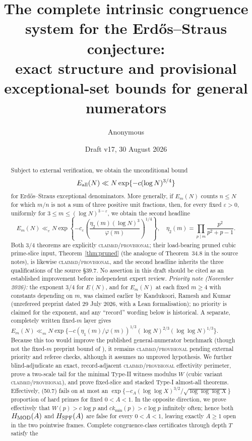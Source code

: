 \documentclass[10pt,reqno]{amsart}
\title[Intrinsic congruences and provisional $3/4$ bounds]{The complete intrinsic congruence system for the Erd\H{o}s--Straus conjecture:\\ exact structure and provisional exceptional-set bounds for general numerators}
\author{Anonymous}
\date{Draft v17, 30 August 2026}
\theoremstyle{definition}
\newcommand{\1}{\mathbf 1}
\newcommand{\eps}{\varepsilon}
\begin{document}
\begin{abstract}
\fontsize{7}{7.5}\selectfont
Subject to external verification, we obtain the unconditional bound
\[
 E_{\rm all}(N)\ll N\exp\{-c(\log N)^{3/4}\}
\]
for Erd\H{o}s--Straus exceptional denominators.  More generally, if $E_m(N)$
counts $n\leq N$ for which $m/n$ is not a sum of three positive unit
fractions, then, for every fixed $\eps>0$, uniformly for
$3\leq m\leq(\log N)^{3-\eps}$, we obtain the second headline
\[
 \textstyle E_m(N)\ll_\eps N\exp\left\{-c_\eps
 \left(\frac{\eta_2(m)(\log N)^3}{\varphi(m)}\right)^{1/4}\right\},
 \quad \eta_2(m)=\prod_{p\mid m}\frac {p^2}{p^2+p-1}.
\]
Both $3/4$ theorems are explicitly
\textsc{claimed}/\allowbreak\textsc{provisional}; their load-bearing pruned
cubic prime-slice input, Theorem~\ref{thm:pruned} (the analogue of
Theorem~34.8 in the source notes), is likewise
\textsc{claimed}/\allowbreak\textsc{provisional}, and the second headline
inherits the three qualifications of the source \S39.7.  No assertion in
this draft should be cited as an established improvement before independent
expert review.  \emph{Priority note (November 2026):} the exponent $3/4$
for $E(N)$, and for $E_m(N)$ at each fixed $m\geq4$ with constants
depending on $m$, was claimed earlier by Kandukoori, Ramesh and Kumar
\cite{KRK} (unrefereed preprint dated 29 July 2026, with a Lean
formalisation); no priority is claimed for the exponent, and any
``record'' wording below is historical.  A separate, completely written fixed-$m$ layer gives
$E_m(N)\ll_m N\exp\{-c(\eta_1(m)/\varphi(m))^{1/3}
(\log N)^{2/3}(\log\log N)^{1/3}\}$.  Because this too would improve the
published general-numerator benchmark (though not the fixed-$m$ preprint
bound of \cite{KRK}), it remains
\textsc{claimed/provisional} pending external priority and referee checks,
although it assumes no unproved hypothesis.  We further
blind-adjudicate an exact, record-adjacent \textsc{claimed/provisional}
effectivity perimeter, prove a two-scale tail for the minimal Type-II
witness modulus $W$ (cubic variant \textsc{claimed/provisional}), and prove
fixed-slice and stacked Type-I almost-all theorems.  Effectively, (50.7)
fails on at most an
$\exp\{-c_A(\log\log X)^{3/2}/\sqrt{\log\log\log X}\}$ proportion of hard
primes for fixed $0<A<1$.  In the opposite direction, we prove effectively
that $W(p)>c\log p$ and $ck_{\min}(p)>c\log p$ infinitely often; hence both
$H_{\rm MOD}(A)$ and $H_{\rm SPF}(A)$ are false for every $0<A<1$, leaving
exactly $A\geq1$ open in the two pointwise frames.  Complete congruence-class certificates through depth $T$ satisfy the

\end{abstract}
\end{document}
